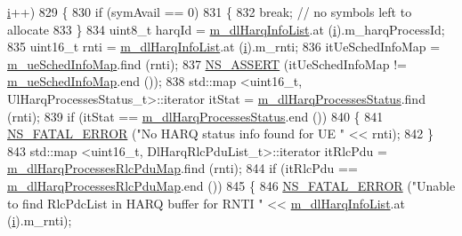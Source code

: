 \begin{DoxyCode}
      \hyperlink{bernuolliDistribution_8m_a6f6ccfcf58b31cb6412107d9d5281426}{i}++)
829                 \{
830                         \textcolor{keywordflow}{if} (symAvail == 0)
831                         \{
832                                 \textcolor{keywordflow}{break};  \textcolor{comment}{// no symbols left to allocate}
833                         \}
834                         uint8\_t harqId = \hyperlink{classns3_1_1MmWaveFlexTtiMaxWeightMacScheduler_afcc7ec068937dbf27338c5ed6a7a2f77}{m\_dlHarqInfoList}.at (\hyperlink{bernuolliDistribution_8m_a6f6ccfcf58b31cb6412107d9d5281426}{i}).m\_harqProcessId;
835                         uint16\_t rnti = \hyperlink{classns3_1_1MmWaveFlexTtiMaxWeightMacScheduler_afcc7ec068937dbf27338c5ed6a7a2f77}{m\_dlHarqInfoList}.at (\hyperlink{bernuolliDistribution_8m_a6f6ccfcf58b31cb6412107d9d5281426}{i}).m\_rnti;
836                         itUeSchedInfoMap = \hyperlink{classns3_1_1MmWaveFlexTtiMaxWeightMacScheduler_a6c90cb4d10b9d6347f7447508f5bebfe}{m\_ueSchedInfoMap}.find (rnti);
837                         \hyperlink{assert_8h_a6dccdb0de9b252f60088ce281c49d052}{NS\_ASSERT} (itUeSchedInfoMap != \hyperlink{classns3_1_1MmWaveFlexTtiMaxWeightMacScheduler_a6c90cb4d10b9d6347f7447508f5bebfe}{m\_ueSchedInfoMap}.end ());
838                         std::map <uint16\_t, UlHarqProcessesStatus\_t>::iterator itStat = 
      \hyperlink{classns3_1_1MmWaveFlexTtiMaxWeightMacScheduler_a798ed476b56504b548455147167df24b}{m\_dlHarqProcessesStatus}.find (rnti);
839                         \textcolor{keywordflow}{if} (itStat == \hyperlink{classns3_1_1MmWaveFlexTtiMaxWeightMacScheduler_a798ed476b56504b548455147167df24b}{m\_dlHarqProcessesStatus}.end ())
840                         \{
841                                 \hyperlink{group__fatal_ga5131d5e3f75d7d4cbfd706ac456fdc85}{NS\_FATAL\_ERROR} (\textcolor{stringliteral}{"No HARQ status info found for UE "} << rnti);
842                         \}
843                         std::map <uint16\_t, DlHarqRlcPduList\_t>::iterator itRlcPdu =  
      \hyperlink{classns3_1_1MmWaveFlexTtiMaxWeightMacScheduler_aa9cdf43f057d1bd8e1cfcf2a21ea89f0}{m\_dlHarqProcessesRlcPduMap}.find (rnti);
844                         \textcolor{keywordflow}{if} (itRlcPdu == \hyperlink{classns3_1_1MmWaveFlexTtiMaxWeightMacScheduler_aa9cdf43f057d1bd8e1cfcf2a21ea89f0}{m\_dlHarqProcessesRlcPduMap}.end ())
845                         \{
846                                 \hyperlink{group__fatal_ga5131d5e3f75d7d4cbfd706ac456fdc85}{NS\_FATAL\_ERROR} (\textcolor{stringliteral}{"Unable to find RlcPdcList in HARQ buffer for
       RNTI "} << \hyperlink{classns3_1_1MmWaveFlexTtiMaxWeightMacScheduler_afcc7ec068937dbf27338c5ed6a7a2f77}{m\_dlHarqInfoList}.at (\hyperlink{bernuolliDistribution_8m_a6f6ccfcf58b31cb6412107d9d5281426}{i}).m\_rnti);

\end{DoxyCode}
